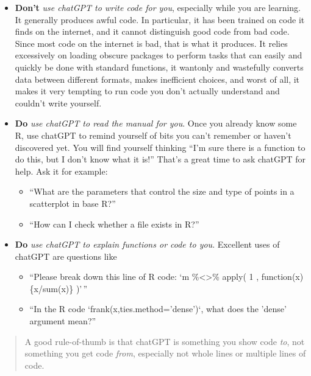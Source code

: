\documentclass[
]{article}
\providecommand{\tightlist}{%
  \setlength{\itemsep}{0pt}\setlength{\parskip}{0pt}}
\begin{document}
\begin{itemize}
\tightlist
\item
  \textbf{Don't} \emph{use chatGPT to write code for you}, especially
  while you are learning. It generally produces awful code. In
  particular, it has been trained on code it finds on the internet, and
  it cannot distinguish good code from bad code. Since most code on the
  internet is bad, that is what it produces. It relies excessively on
  loading obscure packages to perform tasks that can easily and quickly
  be done with standard functions, it wantonly and wastefully converts
  data between different formats, makes inefficient choices, and worst
  of all, it makes it very tempting to run code you don't actually
  understand and couldn't write yourself.
\item
  \textbf{Do} \emph{use chatGPT to read the manual for you}. Once you
  already know some R, use chatGPT to remind yourself of bits you can't
  remember or haven't discovered yet. You will find yourself thinking
  ``I'm sure there is a function to do this, but I don't know what it
  is!'' That's a great time to ask chatGPT for help. Ask it for example:

  \begin{itemize}
  \tightlist
  \item
    ``What are the parameters that control the size and type of points
    in a scatterplot in base R?''
  \item
    ``How can I check whether a file exists in R?''
  \end{itemize}
\item
  \textbf{Do} \emph{use chatGPT to explain functions or code to you}.
  Excellent uses of chatGPT are questions like

  \begin{itemize}
  \tightlist
  \item
    ``Please break down this line of R code: `m
    \%\textless\textgreater\% apply( 1 , function(x)\{x/sum(x)\} )'\,''
  \item
    ``In the R code `frank(x,ties.method='dense')`, what does the
    'dense' argument mean?''
  \end{itemize}
\end{itemize}

\begin{quote}
A good rule-of-thumb is that chatGPT is something you show code
\emph{to}, not something you get code \emph{from}, especially not whole
lines or multiple lines of code.
\end{quote}
\end{document}
